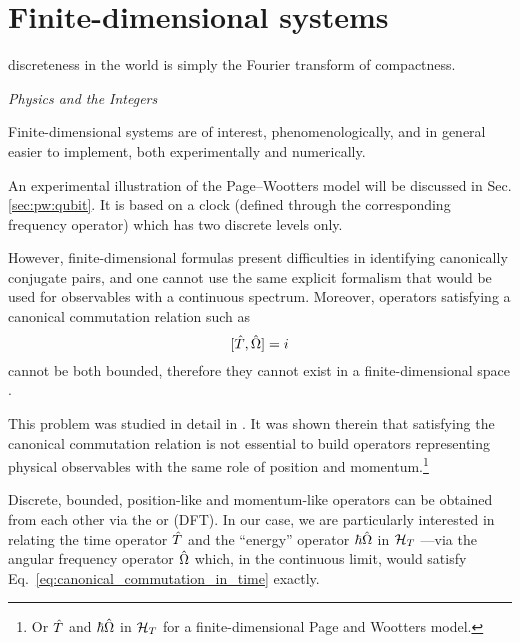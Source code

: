 \section{Finite-dimensional systems}\label{sec:finite-quantum}\label{sec:pw:theory_last}
\epigraph{\textelp{} discreteness in the world is simply the Fourier transform of compactness.}{%
  \emph{Physics and the Integers} \parencite{Tong_Integers}%
}

\noindent
Finite-dimensional systems are of interest, phenomenologically,
and in general easier to implement,
both experimentally and numerically.

An experimental illustration of the Page--Wootters model will be discussed in Sec. \ref{sec:pw:qubit}.
It is based on a clock
(defined through the corresponding frequency operator)
which has two discrete levels only.

However,
finite-dimensional formulas
present difficulties in identifying canonically conjugate
pairs, and one cannot use the same explicit formalism
that would be used for observables with a continuous spectrum.
Moreover, operators satisfying a canonical
commutation relation such as
\begin{equation}\label{eq:canonical_commutation_in_time}
  [\hat{T}, \hat{\Omega}] = i
\end{equation}
cannot be both bounded,
therefore they cannot exist
in a finite-dimensional space \parencite{Weyl:FiniteComm}.

This problem was studied in detail in
\cite{FiniteHilb}. It was shown therein
that satisfying the canonical commutation relation
is not essential to build operators representing physical observables
with the same role of position and momentum.\footnote{
  Or $\hat{T}$ and $\hbar\hat{\Omega}$
  in $\mathcal{H}_T$ for a finite-dimensional Page and Wootters model.
}

Discrete, bounded, position-like and momentum-like operators can be obtained from
each other via
the  or   (DFT).
In our case, we are particularly interested in relating the
time operator $\hat{T}$ and the ``energy'' operator $\hbar\hat{\Omega}$
in $\mathcal{H}_T$ ---via the angular frequency operator $\hat{\Omega}$ which, in the continuous limit, would satisfy
Eq.~\eqref{eq:canonical_commutation_in_time} exactly.


